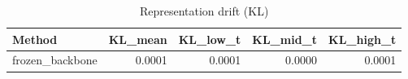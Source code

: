 \begin{table}[htbp]
\centering
\caption{Representation drift (KL)}
\label{tab:repr-drift}
\begin{tabular}{lrrrr}
\toprule
\textbf{Method} & \textbf{KL\_mean} & \textbf{KL\_low\_t} & \textbf{KL\_mid\_t} & \textbf{KL\_high\_t} \\
\midrule
frozen\_backbone & 0.0001 & 0.0001 & 0.0000 & 0.0001 \\
\bottomrule
\end{tabular}
\end{table}